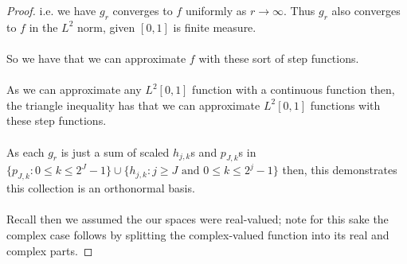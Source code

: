 \documentclass[12pt]{article}
\newenvironment{ex}[2][Exercise]{\begin{trivlist}
\item[\hskip \labelsep {\bfseries #1}\hskip \labelsep {\bfseries #2.}]}{\end{trivlist}}
\begin{document}
\begin{ex}{14}
\begin{enumerate}[label=(\alph*)]
\begin{proof}
            i.e. we have $g_r$ converges to $f$ uniformly as $r \rightarrow \infty$. Thus $g_r$ also converges to $f$ in the $L^2$ norm, given $[0,1]$ is finite measure. \\ \\
            So we have that we can approximate $f$ with these sort of step functions. \\ \\As we can approximate any $L^2[0,1]$ function with a continuous function then, the triangle inequality has that we can approximate $L^2[0,1]$ functions with these step functions. \\ \\
            As each $g_r$ is just a sum of scaled $h_{j,k}$s and $p_{J,k}$s in $\{p_{J,k} : 0 \leq k \leq 2^J - 1\} \cup \{h_{j, k} : j \geq J \text{ and } 0 \leq k \leq 2^j - 1\}$ then, this demonstrates this collection is an orthonormal basis. \\ \\
            Recall then we assumed the our spaces were real-valued; note for this sake the complex case follows by splitting the complex-valued function into its real and complex parts.
        \end{proof}
    \end{enumerate}
\end{ex}
\end{document}
